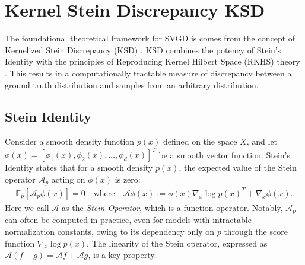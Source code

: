 \documentclass[11pt]{isr} %
\begin{document}
\section*{Kernel Stein Discrepancy KSD} 
The foundational theoretical framework for SVGD is comes from the concept of Kernelized Stein Discrepancy (KSD) \cite{liu2016kernelized}. KSD combines the potency of Stein's Identity \cite{stein1972bound} with the principles of Reproducing Kernel Hilbert Space (RKHS) theory \cite{berlinet2011reproducing}.
This results in a computationally tractable measure of discrepancy between a ground truth distribution and samples from an arbitrary distribution.
\subsection*{Stein Identity}
Consider a smooth density function $p(x)$ defined on the space $X$, and let $\phi(x) = \left[ \phi_{1}(x), \phi_{2}(x), \ldots , \phi_{d} (x) \right ] ^{T}$ be a smooth vector function.
Stein's Identity \cite{stein1972bound} states that for a smooth density $p(x)$, the expected value of the Stein operator $\mathcal{A}_p$ acting on $\phi(x)$ is zero:
\begin{align*}
  \mathbb{E}_{p} \left[ \mathcal{A}_{p} \phi(x) \right] = 0 \quad \text{where} \quad \mathcal{A}\phi(x)  := \phi(x) \nabla_x \log p(x) ^{T} + \nabla_x \phi(x). 
\end{align*}
 Here we call $\mathcal{A}$ as the \textit{Stein Operator}, which is a function operator.
 Notably, $\mathcal{A}_p$ can often be computed in practice, even for models with intractable normalization constants, owing to its dependency only on $p$ through the score function $\nabla_x \log p(x)$.
The linearity of the Stein operator, expressed as $ \mathcal{A}( f + g) = \mathcal{A}f + \mathcal{A}g$, is a key property.
\end{document}
